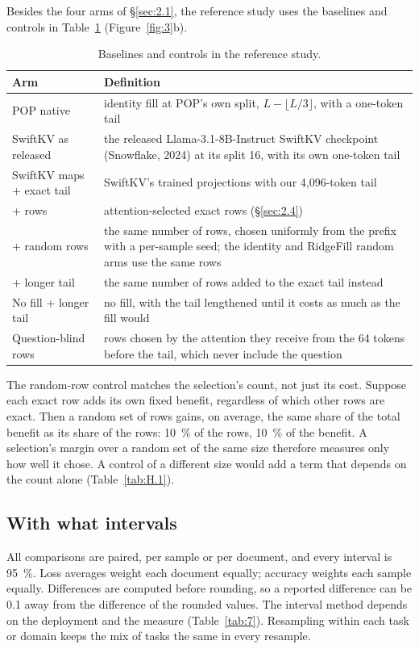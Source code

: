 \documentclass[11pt]{article}
\begin{document}
Besides the four arms of \S\ref{sec:2.1}, the reference study uses the baselines and controls in Table~\ref{tab:6} (Figure~\ref{fig:3}b).

\begin{table}[!htbp]
\centering
\caption{Baselines and controls in the reference study.}\label{tab:6}
\footnotesize
\setlength{\tabcolsep}{4pt}
\begin{tabularx}{\linewidth}{>{\raggedright\arraybackslash\hsize=0.526\hsize}X>{\raggedright\arraybackslash\hsize=1.474\hsize}X}
\toprule
Arm & Definition \\
\midrule
POP native & identity fill at POP's own split, $L - \lfloor L/3 \rfloor$, with a one-token tail \\
SwiftKV as released & the released Llama-3.1-8B-Instruct SwiftKV checkpoint (Snowflake, 2024) at its split 16, with its own one-token tail \\
SwiftKV maps + exact tail & SwiftKV's trained projections with our 4,096-token tail \\
+ rows & attention-selected exact rows (\S\ref{sec:2.4}) \\
+ random rows & the same number of rows, chosen uniformly from the prefix with a per-sample seed; the identity and RidgeFill random arms use the same rows \\
+ longer tail & the same number of rows added to the exact tail instead \\
No fill + longer tail & no fill, with the tail lengthened until it costs as much as the fill would \\
Question-blind rows & rows chosen by the attention they receive from the 64 tokens before the tail, which never include the question \\
\bottomrule
\end{tabularx}
\end{table}

The random-row control matches the selection's count, not just its cost. Suppose each exact row adds its own fixed benefit, regardless of which other rows are exact. Then a random set of rows gains, on average, the same share of the total benefit as its share of the rows: 10~\% of the rows, 10~\% of the benefit. A selection's margin over a random set of the same size therefore measures only how well it chose. A control of a different size would add a term that depends on the count alone (Table~\ref{tab:H.1}).


\subsection{With what intervals}\label{sec:3.4}
All comparisons are paired, per sample or per document, and every interval is 95~\%. Loss averages weight each document equally; accuracy weights each sample equally. Differences are computed before rounding, so a reported difference can be 0.1 away from the difference of the rounded values. The interval method depends on the deployment and the measure (Table~\ref{tab:7}). Resampling within each task or domain keeps the mix of tasks the same in every resample.
\end{document}
